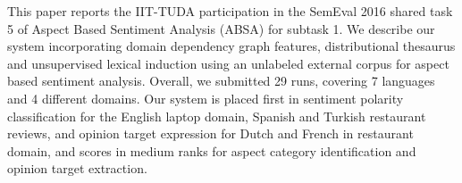This paper reports the IIT-TUDA participation in the SemEval 2016 shared task 5 of Aspect Based Sentiment Analysis (ABSA) for subtask 1. We describe our system incorporating domain dependency graph features, distributional thesaurus and unsupervised lexical induction using an unlabeled external corpus for aspect based sentiment analysis. Overall, we submitted 29 runs, covering 7 languages and 4 different domains. Our system is placed first in sentiment polarity classification for the English laptop domain, Spanish and Turkish restaurant reviews, and opinion target expression for Dutch and French in restaurant domain, and scores in medium ranks for aspect category identification and opinion target extraction.
